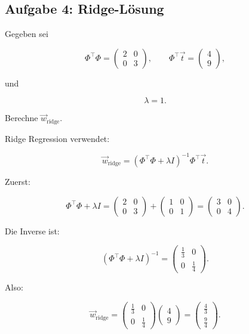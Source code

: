 \subsection{Aufgabe 4: Ridge-Lösung}

Gegeben sei

\[
    \Phi^{\top}\Phi
    =
    \begin{pmatrix}
        2 & 0 \\
        0 & 3
    \end{pmatrix},
    \qquad
    \Phi^{\top}\vec{t}
    =
    \begin{pmatrix}
        4 \\
        9
    \end{pmatrix},
\]

und

\[
    \lambda = 1.
\]

Berechne \(\vec{w}_{\mathrm{ridge}}\).

\begin{examplebox}
Ridge Regression verwendet:

\[
    \vec{w}_{\mathrm{ridge}}
    =
    (\Phi^{\top}\Phi+\lambda I)^{-1}
    \Phi^{\top}\vec{t}.
\]

Zuerst:

\[
    \Phi^{\top}\Phi+\lambda I
    =
    \begin{pmatrix}
        2 & 0 \\
        0 & 3
    \end{pmatrix}
    +
    \begin{pmatrix}
        1 & 0 \\
        0 & 1
    \end{pmatrix}
    =
    \begin{pmatrix}
        3 & 0 \\
        0 & 4
    \end{pmatrix}.
\]

Die Inverse ist:

\[
    (\Phi^{\top}\Phi+\lambda I)^{-1}
    =
    \begin{pmatrix}
        \frac{1}{3} & 0 \\
        0 & \frac{1}{4}
    \end{pmatrix}.
\]

Also:

\[
    \vec{w}_{\mathrm{ridge}}
    =
    \begin{pmatrix}
        \frac{1}{3} & 0 \\
        0 & \frac{1}{4}
    \end{pmatrix}
    \begin{pmatrix}
        4 \\
        9
    \end{pmatrix}
    =
    \begin{pmatrix}
        \frac{4}{3} \\
        \frac{9}{4}
    \end{pmatrix}.
\]
\end{examplebox}

